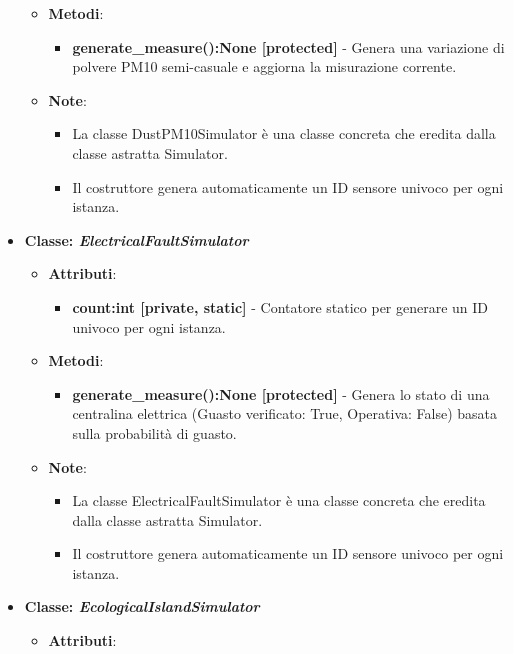 \begin{itemize}
\begin{itemize}
\begin{itemize}
    \end{itemize}
    \item    \textbf{Metodi}: 
    \begin{itemize}
        \item \textbf{generate\_measure():None [protected]} - Genera una variazione di polvere PM10 semi-casuale e aggiorna la misurazione corrente.
    \end{itemize}
    \item    \textbf{Note}:
    \begin{itemize}
        \item La classe DustPM10Simulator è una classe concreta che eredita dalla classe astratta Simulator.
        \item Il costruttore genera automaticamente un ID sensore univoco per ogni istanza.
    \end{itemize}
\end{itemize}
    \item{\textbf{Classe: \textit{ElectricalFaultSimulator}}}
    \begin{itemize}
        \item   \textbf{Attributi}: 
    \begin{itemize}
        \item \textbf{count:int [private, static]} - Contatore statico per generare un ID univoco per ogni istanza.
    \end{itemize}
    \item   \textbf{Metodi}: 
    \begin{itemize}
        \item \textbf{generate\_measure():None [protected]} - Genera lo stato di una centralina elettrica (Guasto verificato: True, Operativa: False) basata sulla probabilità di guasto.
    \end{itemize}
    \item   \textbf{Note}:
    \begin{itemize}
        \item La classe ElectricalFaultSimulator è una classe concreta che eredita dalla classe astratta Simulator.
        \item Il costruttore genera automaticamente un ID sensore univoco per ogni istanza.
    \end{itemize}
\end{itemize}
    \item{\textbf{Classe: \textit{EcologicalIslandSimulator}}}
    \begin{itemize}
        \item    \textbf{Attributi}: 

\end{itemize}
\end{itemize}
